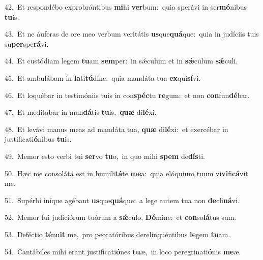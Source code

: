{\numbfont\textcolor{\numbcolor}{42.}}~Et respondébo exprobrántibus \textbf{mi}\-hi \textbf{ver}\-bum:~\star quia sperávi in ser\-\textbf{mó}\-nibus \textbf{tu}\-is.\par
{\numbfont\textcolor{\numbcolor}{43.}}~Et ne áuferas de ore meo verbum veritátis \textbf{us}\-que\-\textbf{quá}\-que:~\star quia in judíciis tuis su\-\textbf{per}\-spe\-\textbf{rá}\-vi.\par
{\numbfont\textcolor{\numbcolor}{44.}}~Et custódiam legem \textbf{tu}\-am \textbf{sem}\-per:~\star in sǽculum et in \textbf{sǽ}\-culum \textbf{sǽ}\-culi.\par
{\numbfont\textcolor{\numbcolor}{45.}}~Et ambulábam in \textbf{la}\-ti\-\textbf{tú}\-dine:~\star quia mandáta tua \textbf{ex}\-qui\-\textbf{sí}\-vi.\par
{\numbfont\textcolor{\numbcolor}{46.}}~Et loquébar in testimóniis tuis in con\-\textbf{spéc}\-tu \textbf{re}\-gum:~\star et non \textbf{con}\-fun\-\textbf{dé}\-bar.\par
{\numbfont\textcolor{\numbcolor}{47.}}~Et meditábar in man\-\textbf{dá}\-tis \textbf{tu}\-is,~\star \textbf{quæ} di\-\textbf{lé}\-xi.\par
{\numbfont\textcolor{\numbcolor}{48.}}~Et levávi manus meas ad mandáta tua, \textbf{quæ} di\-\textbf{lé}\-xi:~\star et exercébar in justificati\-\textbf{ó}\-nibus \textbf{tu}\-is.\par
{\numbfont\textcolor{\numbcolor}{49.}}~Memor esto verbi tui \textbf{ser}\-vo \textbf{tu}\-o,~\star in quo mihi \textbf{spem} de\-\textbf{dís}\-ti.\par
{\numbfont\textcolor{\numbcolor}{50.}}~Hæc me consoláta est in humili\-\textbf{tá}\-te \textbf{me}\-a:~\star quia elóquium tuum vi\-\textbf{vi}\-fi\-\textbf{cá}\-vit me.\par
{\numbfont\textcolor{\numbcolor}{51.}}~Supérbi iníque agébant \textbf{us}\-que\-\textbf{quá}\-que:~\star a lege autem tua non \textbf{de}\-cli\-\textbf{ná}\-vi.\par
{\numbfont\textcolor{\numbcolor}{52.}}~Memor fui judiciórum tuórum a \textbf{sǽ}\-culo, \textbf{Dó}\-mine:~\star et \textbf{con}\-so\-\textbf{lá}\-tus sum.\par
{\numbfont\textcolor{\numbcolor}{53.}}~Deféctio \textbf{té}\-nu\textbf{it} me,~\star pro peccatóribus derelinquéntibus \textbf{le}\-gem \textbf{tu}\-am.\par
{\numbfont\textcolor{\numbcolor}{54.}}~Cantábiles mihi erant justificati\-\textbf{ó}\-nes \textbf{tu}\-æ,~\star in loco peregrinati\-\textbf{ó}\-nis \textbf{me}\-æ.\par
